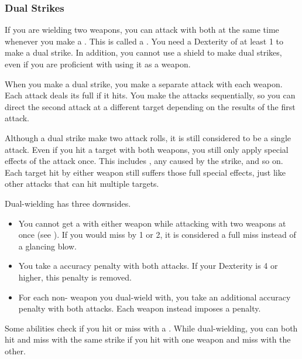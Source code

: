         \subsubsection{Dual Strikes}\label{Dual Strikes}
            If you are wielding two weapons, you can attack with both at the same time whenever you make a .
            This is called a .
            You need a Dexterity of at least 1 to make a dual strike.
            In addition, you cannot use a shield to make dual strikes, even if you are proficient with using it as a weapon.

            When you make a dual strike, you make a separate attack with each weapon.
            Each attack deals its full  if it hits.
            You make the attacks sequentially, so you can direct the second attack at a different target depending on the results of the first attack.

            Although a dual strike make two attack rolls, it is still considered to be a single attack.
            Even if you hit a target with both weapons, you still only apply special effects of the attack once.
            This includes , any  caused by the strike, and so on.
            Each target hit by either weapon still suffers those full special effects, just like other attacks that can hit multiple targets.

            Dual-wielding has three downsides.
            \begin{itemize}
                \item You cannot get a  with either weapon while attacking with two weapons at once (see ).
                    If you would miss by 1 or 2, it is considered a full miss instead of a glancing blow.
                \item You take a  accuracy penalty with both attacks.
                    If your Dexterity is 4 or higher, this penalty is removed.
                \item For each non- weapon you dual-wield with, you take an additional  accuracy penalty with both attacks.
                    Each  weapon instead imposes a  penalty.
            \end{itemize}

            Some abilities check if you hit or miss with a .
            While dual-wielding, you can both hit and miss with the same strike if you hit with one weapon and miss with the other.

